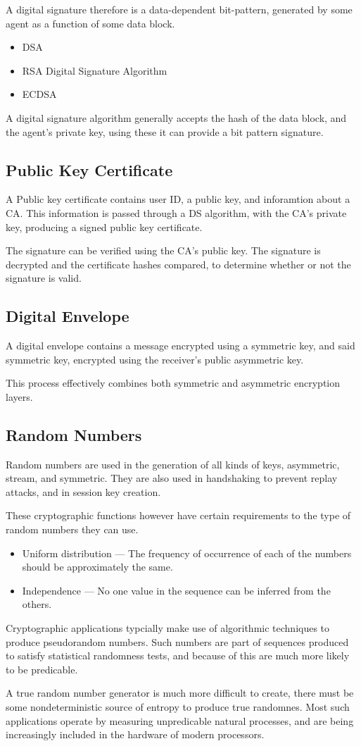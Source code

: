 A digital signature therefore is a data-dependent bit-pattern, generated by some agent as a function of some data block.
\begin{itemize}
    \item DSA
    \item RSA Digital Signature Algorithm
    \item ECDSA
\end{itemize}

A digital signature algorithm generally accepts the hash of the data block, and the agent's private key,
using these it can provide a bit pattern signature.

\subsection{Public Key Certificate}
A Public key certificate contains user ID, a public key, and inforamtion about a CA.
This information is passed through a DS algorithm, with the CA's private key, producing a signed
public key certificate.

The signature can be verified using the CA's public key. The signature is decrypted and the certificate hashes compared,
to determine whether or not the signature is valid.

\subsection{Digital Envelope}
A digital envelope contains a message encrypted using a symmetric key, and said symmetric key, encrypted
using the receiver's public asymmetric key.

This process effectively combines both symmetric and asymmetric encryption layers.

\subsection{Random Numbers}
Random numbers are used in the generation of all kinds of keys, asymmetric, stream, and symmetric. They are also used in handshaking to
prevent replay attacks, and in session key creation.

These cryptographic functions however have certain requirements to the type of random numbers they can use.
\begin{itemize}
    \item Uniform distribution --- The frequency of occurrence of each of the numbers should be approximately the same.
    \item Independence --- No one value in the sequence can be inferred from the others.
\end{itemize}

Cryptographic applications typcially make use of algorithmic techniques to produce pseudorandom numbers. Such numbers are
part of sequences produced to satisfy statistical randomness tests, and because of this are much more likely to be predicable.

A true random number generator is much more difficult to create, there must be some nondeterministic source of entropy to produce true randomnes.
Most such applications operate by measuring unpredicable natural processes, and are being increasingly included in the hardware of modern processors.